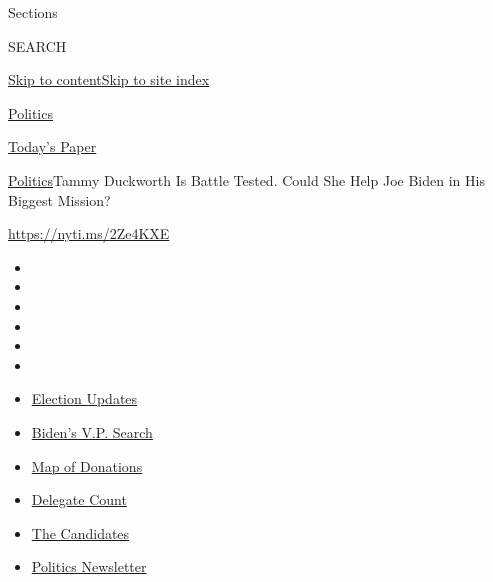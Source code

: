Sections

SEARCH

\protect\hyperlink{site-content}{Skip to
content}\protect\hyperlink{site-index}{Skip to site index}

\href{https://www.nytimes.com/section/politics}{Politics}

\href{https://myaccount.nytimes.com/auth/login?response_type=cookie\&client_id=vi}{}

\href{https://www.nytimes.com/section/todayspaper}{Today's Paper}

\href{/section/politics}{Politics}\textbar{}Tammy Duckworth Is Battle
Tested. Could She Help Joe Biden in His Biggest Mission?

\url{https://nyti.ms/2Ze4KXE}

\begin{itemize}
\item
\item
\item
\item
\item
\item
\end{itemize}

\begin{itemize}
\item
  \href{https://www.nytimes.com/2020/07/31/us/elections/biden-vs-trump.html?action=click\&pgtype=Article\&state=default\&region=TOP_BANNER\&context=storylines_menu}{Election
  Updates}
\item
  \href{https://www.nytimes.com/article/biden-vice-president-2020.html?action=click\&pgtype=Article\&state=default\&region=TOP_BANNER\&context=storylines_menu}{Biden's
  V.P. Search}
\item
  \href{https://www.nytimes.com/interactive/2020/07/24/us/politics/trump-biden-campaign-donors.html?action=click\&pgtype=Article\&state=default\&region=TOP_BANNER\&context=storylines_menu}{Map
  of Donations}
\item
  \href{https://www.nytimes.com/interactive/2020/us/elections/delegate-count-primary-results.html?action=click\&pgtype=Article\&state=default\&region=TOP_BANNER\&context=storylines_menu}{Delegate
  Count}
\item
  \href{https://www.nytimes.com/interactive/2019/us/politics/2020-presidential-candidates.html?action=click\&pgtype=Article\&state=default\&region=TOP_BANNER\&context=storylines_menu}{The
  Candidates}
\item
  \href{https://www.nytimes.com/newsletters/politics?action=click\&pgtype=Article\&state=default\&region=TOP_BANNER\&context=storylines_menu}{Politics
  Newsletter}
\end{itemize}

